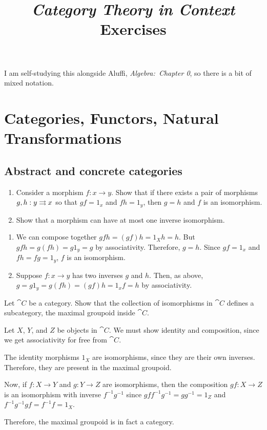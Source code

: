 \documentclass[notes,tikz]{agony}
\title{\emph{Category Theory in Context} Exercises}
\newcommand{\inenum}{\vspace{-1.8em}}
\begin{document}
\thispagestyle{firstpage}
\renewcommand{\contentsname}{Exercises\\{\Large from Riehl, \emph{Category Theory in Context}}}
\tableofcontents

I am self-studying this alongside Aluffi, \emph{Algebra:\ Chapter 0},
so there is a bit of mixed notation.

\chapter{Categories, Functors, Natural Transformations}

\section{Abstract and concrete categories}

\begin{xca}
  \leavevmode
  \begin{enumerate}
    \item Consider a morphism $f : x \to y$.
          Show that if there exists a pair of morphisms $g, h : y \rightrightarrows x$
          so that $g f = 1_x$ and $f h = 1_y$, then $g = h$ and $f$ is an isomorphism.
    \item Show that a morphism can have at most one inverse isomorphism.
  \end{enumerate}
\end{xca}
\begin{enumerate}
  \item \begin{prf}\inenum
          We can compose together $gfh = (gf)h = 1_Xh = h$.
          But $gfh = g(fh) = g1_y = g$ by associativity.
          Therefore, $g = h$.
          Since $gf = 1_x$ and $fh = fg = 1_y$, $f$ is an isomorphism.
        \end{prf}
  \item \begin{prf}\inenum
          Suppose $f : x \to y$ has two inverses $g$ and $h$.
          Then, as above, $g = g1_y = g(fh) = (gf)h = 1_xf = h$ by associativity.
        \end{prf}
\end{enumerate}

\begin{xca}
  Let $\cat C$ be a category.
  Show that the collection of isomorphisms in $\cat C$ defines a subcategory,
  the maximal groupoid inside $\cat C$.
\end{xca}
\begin{prf}
  Let $X$, $Y$, and $Z$ be objects in $\cat C$.
  We must show identity and composition, since we get associativity for free from $\cat C$.

  The identity morphisms $1_X$ are isomorphisms, since they are their own inverses.
  Therefore, they are present in the maximal groupoid.

  Now, if $f : X \to Y$ and $g : Y \to Z$ are isomorphisms,
  then the composition $gf : X \to Z$ is an isomorphism with inverse $f^{-1}g^{-1}$
  since $gff^{-1}g^{-1} = gg^{-1} = 1_Z$ and $f^{-1}g^{-1}gf = f^{-1}f = 1_X$.

  Therefore, the maximal groupoid is in fact a category.
\end{prf}
\end{document}
